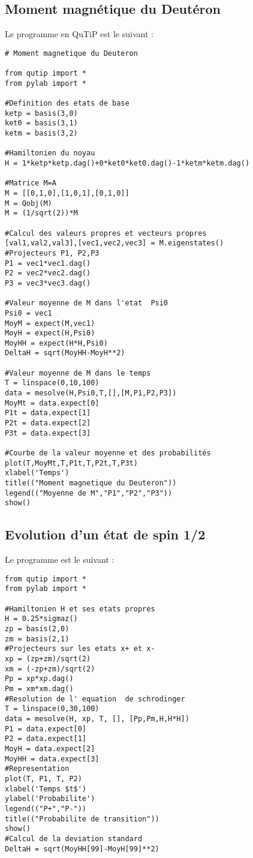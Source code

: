 \documentclass[a4paper,12pt]{book}
\numberwithin{equation}{section}
\begin{document}
\subsection{Moment magnétique du Deutéron}
Le programme en QuTiP est le suivant :
\begin{lstlisting}
# Moment magnetique du Deuteron

from qutip import *
from pylab import *

#Definition des etats de base
ketp = basis(3,0)
ket0 = basis(3,1)
ketm = basis(3,2)

#Hamiltonien du noyau
H = 1*ketp*ketp.dag()+0*ket0*ket0.dag()-1*ketm*ketm.dag()

#Matrice M=A
M = [[0,1,0],[1,0,1],[0,1,0]]
M = Qobj(M)
M = (1/sqrt(2))*M

#Calcul des valeurs propres et vecteurs propres
[val1,val2,val3],[vec1,vec2,vec3] = M.eigenstates()
#Projecteurs P1, P2,P3
P1 = vec1*vec1.dag()
P2 = vec2*vec2.dag()
P3 = vec3*vec3.dag()

#Valeur moyenne de M dans l'etat  Psi0
Psi0 = vec1
MoyM = expect(M,vec1)
MoyH = expect(H,Psi0)
MoyHH = expect(H*H,Psi0)
DeltaH = sqrt(MoyHH-MoyH**2)

#Valeur moyenne de M dans le temps
T = linspace(0,10,100)
data = mesolve(H,Psi0,T,[],[M,P1,P2,P3])
MoyMt = data.expect[0]
P1t = data.expect[1]
P2t = data.expect[2]
P3t = data.expect[3]

#Courbe de la valeur moyenne et des probabilités
plot(T,MoyMt,T,P1t,T,P2t,T,P3t)
xlabel('Temps')
title(("Moment magnetique du Deuteron"))
legend(("Moyenne de M","P1","P2","P3"))
show()

\end{lstlisting}

\subsection{Evolution d'un état de spin 1/2}
Le programme est le suivant :
\begin{lstlisting}
from qutip import *
from pylab import *

#Hamiltonien H et ses etats propres
H = 0.25*sigmaz()
zp = basis(2,0)
zm = basis(2,1)
#Projecteurs sur les etats x+ et x-
xp = (zp+zm)/sqrt(2)
xm = (-zp+zm)/sqrt(2)
Pp = xp*xp.dag()
Pm = xm*xm.dag()
#Resolution de l' equation  de schrodinger
T = linspace(0,30,100)
data = mesolve(H, xp, T, [], [Pp,Pm,H,H*H])
P1 = data.expect[0]
P2 = data.expect[1]
MoyH = data.expect[2]
MoyHH = data.expect[3]
#Representation
plot(T, P1, T, P2)
xlabel('Temps $t$')
ylabel('Probabilite')
legend(("P+","P-"))
title(("Probabilite de transition"))
show()
#Calcul de la deviation standard
DeltaH = sqrt(MoyHH[99]-MoyH[99]**2)
\end{lstlisting}
\end{document}
